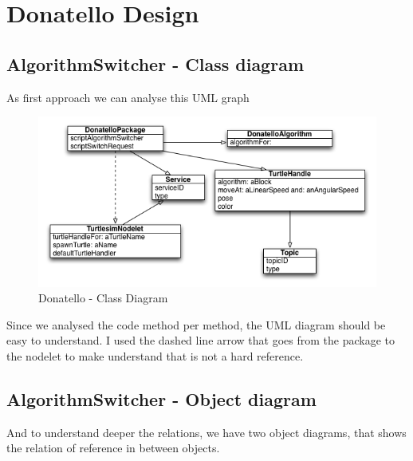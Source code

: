 \documentclass[a4paper,10pt,twoside]{book}
\begin{document}
\fi
\sloppy
\chapter{Donatello Design}
\label{appendix:donatello}
			
\section{ AlgorithmSwitcher - Class diagram}
As first approach we can analyse this UML graph

\begin{figure}[!htbp]
\centering
\includegraphics[width=1\textwidth]{DonatelloClassUml.png}

\caption{Donatello - Class Diagram}
\centering
\end{figure}

Since we analysed the code method per method, the UML diagram should be easy to understand. 
I used the dashed line arrow that goes from the package to the nodelet to make understand that is not a hard reference.
\newpage

\section{ AlgorithmSwitcher - Object diagram}
And to understand deeper the relations, we have two object diagrams, that shows the relation of reference in between objects.
\end{document}
